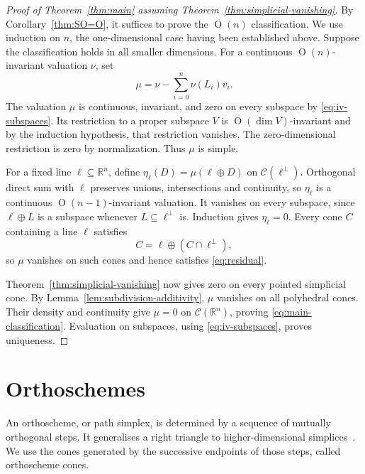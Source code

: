 \documentclass[11pt]{article}
\newcommand{\R}{\mathbb{R}}
\newcommand{\On}[1]{\operatorname{O}(#1)}
\newcommand{\CC}{\mathcal{C}}
\begin{document}
\begin{proof}[Proof of Theorem~\ref{thm:main} assuming Theorem~\ref{thm:simplicial-vanishing}]
By Corollary~\ref{thm:SO=O}, it suffices to prove the $\On n$
classification. We use induction on $n$, the one-dimensional case having been
established above. Suppose the classification holds in all smaller
dimensions. For a continuous $\On n$-invariant valuation $\nu$, set
\[
 \mu=\nu-\sum_{i=0}^n\nu(L_i)v_i.
\]
The valuation $\mu$ is continuous, invariant, and zero on every subspace
by \eqref{eq:iv-subspaces}. Its restriction to a proper subspace $V$
is $\On{\dim V}$-invariant and by the induction hypothesis, that
restriction vanishes. The zero-dimensional restriction is zero by normalization. Thus
$\mu$ is simple.

For a fixed line $\ell\subseteq\R^n$, define
$\eta_\ell(D)=\mu(\ell\oplus D)$ on $\CC(\ell^\perp)$.
Orthogonal direct sum with $\ell$ preserves unions, intersections and
continuity, so $\eta_\ell$ is a continuous $\On{n-1}$-invariant
valuation. It vanishes on every subspace, since $\ell\oplus L$ is a
subspace whenever $L\subseteq\ell^\perp$ is. Induction gives
$\eta_\ell=0$. Every cone $C$ containing a line $\ell$ satisfies
\[
 C=\ell\oplus(C\cap\ell^\perp),
\]
so $\mu$ vanishes on such cones and hence satisfies \eqref{eq:residual}.

Theorem~\ref{thm:simplicial-vanishing} now gives zero on every pointed
simplicial cone. By Lemma~\ref{lem:subdivision-additivity}, $\mu$ vanishes
on all polyhedral cones. Their density and continuity give $\mu=0$ on
$\CC(\R^n)$, proving \eqref{eq:main-classification}. Evaluation on
subspaces, using \eqref{eq:iv-subspaces}, proves uniqueness.
\end{proof}

\section{Orthoschemes}\label{sec:orth}
An orthoscheme, or path simplex, is determined by a sequence of mutually
orthogonal steps. It generalises a right triangle to higher-dimensional
simplices~\cite[\S25]{schlaefli:1901}. We use the cones generated by the
successive endpoints of those steps, called orthoscheme cones. 

\end{document}
